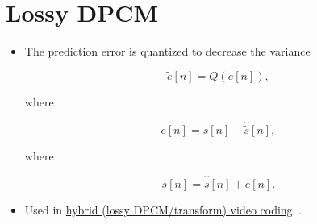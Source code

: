 \section{Lossy DPCM}
\begin{itemize}
\item
  The prediction error is quantized to decrease the variance

  \begin{equation}
    \tilde{e}[n] = Q(e[n]),
  \end{equation}

  where

  \begin{equation}
    e[n] = s[n] - \hat{\tilde{s}}[n],
  \end{equation}

  where

  \begin{equation}
    \tilde{s}[n] = \hat{\tilde{s}}[n] + \tilde{e}[n].
  \end{equation}
\item
  Used in
  \href{https://en.wikipedia.org/wiki/High_Efficiency_Video_Coding\#Video_coding_layer}{hybrid
  (lossy DPCM/transform) video coding}~\cite{cutler1952differential}.
\end{itemize}


